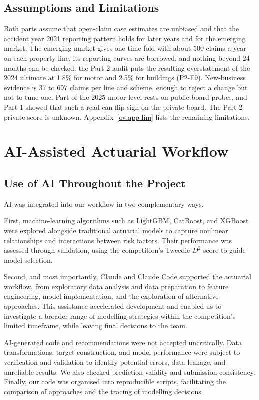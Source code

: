 \documentclass{rapport}
\begin{document}
\subsection{Assumptions and Limitations}

Both parts assume that open-claim case estimates are unbiased and that the accident year 2021 reporting pattern holds
for later years and for the emerging market. The emerging market gives one time fold with about 500 claims a year on
each property line, its reporting curves are borrowed, and nothing beyond 24 months can be checked: the Part 2 audit
puts the resulting overstatement of the 2024 ultimate at 1.8\% for motor and 2.5\% for buildings (P2-F9). New-business
evidence is 37 to 697 claims per line and scheme, enough to reject a change but not to tune one. Part of the 2025 motor
level rests on public-board probes, and Part 1 showed that such a read can flip sign on the private board. The Part 2
private score is unknown. Appendix~\ref{ov:app-lim} lists the remaining limitations.

\section{AI-Assisted Actuarial Workflow}

\subsection{Use of AI Throughout the Project}


AI was integrated into our workflow in two complementary ways.

First, machine-learning algorithms such as LightGBM, CatBoost, and XGBoost were explored alongside traditional actuarial models to capture nonlinear relationships and interactions between risk factors. Their performance was assessed through validation, using the competition's Tweedie $D^2$ score to guide model selection.

Second, and most importantly, Claude and Claude Code supported the actuarial workflow, from exploratory data analysis and data preparation to feature engineering, model implementation, and the exploration of alternative approaches. This assistance accelerated development and enabled us to investigate a broader range of modelling strategies within the competition's limited timeframe, while leaving final decisions to the team.

AI-generated code and recommendations were not accepted uncritically. Data transformations, target construction, and model performance were subject to verification and validation to identify potential errors, data leakage, and unreliable results. We also checked prediction validity and submission consistency. Finally, our code was organised into reproducible scripts, facilitating the comparison of approaches and the tracing of modelling decisions.
\end{document}
